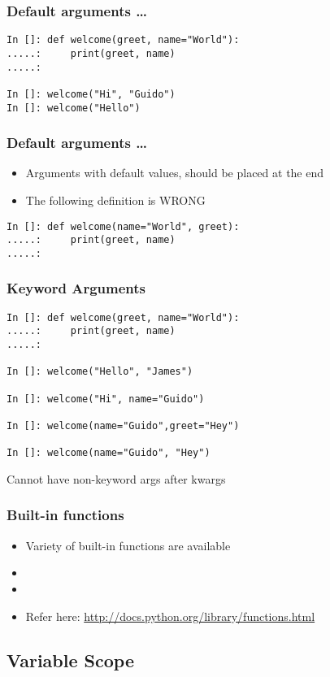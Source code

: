 \documentclass[14pt,compress]{beamer}
\begin{document}
\begin{frame}[fragile]
  \frametitle{Default arguments \ldots}
  \begin{lstlisting}
In []: def welcome(greet, name="World"):
.....:     print(greet, name)
.....:

In []: welcome("Hi", "Guido")
In []: welcome("Hello")
  \end{lstlisting}
\end{frame}
\begin{frame}[fragile]
  \frametitle{Default arguments \ldots}
  \begin{itemize}
  \item Arguments with default values, should be placed at the end
  \item The following definition is \alert{WRONG}
  \end{itemize}
  \begin{lstlisting}
In []: def welcome(name="World", greet):
.....:     print(greet, name)
.....:
  \end{lstlisting}
\end{frame}

\begin{frame}
  \frametitle{Keyword Arguments}
  \begin{lstlisting}
In []: def welcome(greet, name="World"):
.....:     print(greet, name)
.....:

In []: welcome("Hello", "James")

In []: welcome("Hi", name="Guido")

In []: welcome(name="Guido",greet="Hey")

In []: welcome(name="Guido", "Hey")
\end{lstlisting}
Cannot have non-keyword args after kwargs
\end{frame}

\begin{frame}[fragile]
  \frametitle{Built-in functions}
  \begin{itemize}
  \item Variety of built-in functions are available
  \item {}
  \item {}
  \item Refer here:
    \url{http://docs.python.org/library/functions.html}
  \end{itemize}
\end{frame}

\subsection{Variable Scope}
\end{document}
